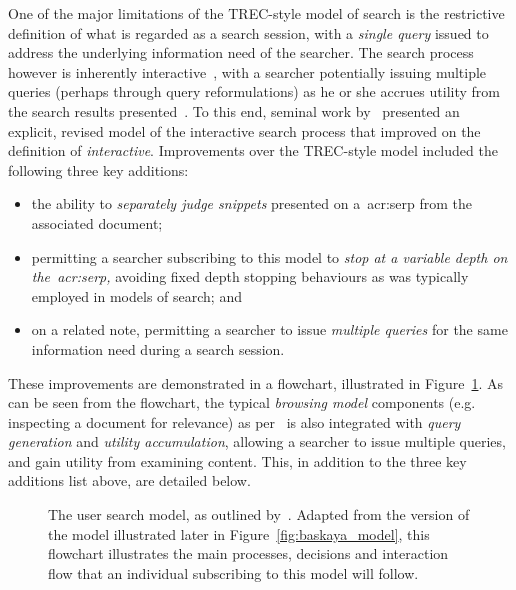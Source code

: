 One of the major limitations of the TREC-style model of search is the restrictive definition of what is regarded as a search session, with a \emph{single query} issued to address the underlying information need of the searcher. The search process however is inherently interactive~\citep{baskaya2013behavioural_factors}, with a searcher potentially issuing multiple queries (perhaps through query reformulations) as he or she accrues utility from the search results presented~\citep{ingwersen2005theturn}. To this end, seminal work by~\cite{baskaya2013behavioural_factors} presented an explicit, revised model of the interactive search process that improved on the definition of \emph{interactive}. Improvements over the TREC-style model included the following three key additions:

\begin{itemize}
    \item{the ability to \emph{separately judge snippets} presented on a~\gls{acr:serp} from the associated document;}
    \item{permitting a searcher subscribing to this model to \emph{stop at a variable depth on the~\gls{acr:serp},} avoiding fixed depth stopping behaviours as was typically employed in models of search; and}
    \item{on a related note, permitting a searcher to issue \emph{multiple queries} for the same information need during a search session.}
\end{itemize}

These improvements are demonstrated in a flowchart, illustrated in Figure~\ref{fig:baskaya_model_flow}. As can be seen from the flowchart, the typical \emph{browsing model} components (e.g. inspecting a document for relevance) as per~\cite{carterette2011models} is also integrated with \emph{query generation} and \emph{utility accumulation}, allowing a searcher to issue multiple queries, and gain utility from examining content. This, in addition to the three key additions list above, are detailed below.

\begin{figure}[t!]
    \centering
    \caption[Flowchart of the search process by~\cite{baskaya2013behavioural_factors}]{The user search model, as outlined by~\cite{baskaya2013behavioural_factors}. Adapted from the version of the model illustrated later in Figure~\ref{fig:baskaya_model}, this flowchart illustrates the main processes, decisions and interaction flow that an individual subscribing to this model will follow.}
    \label{fig:baskaya_model_flow}
\end{figure}

